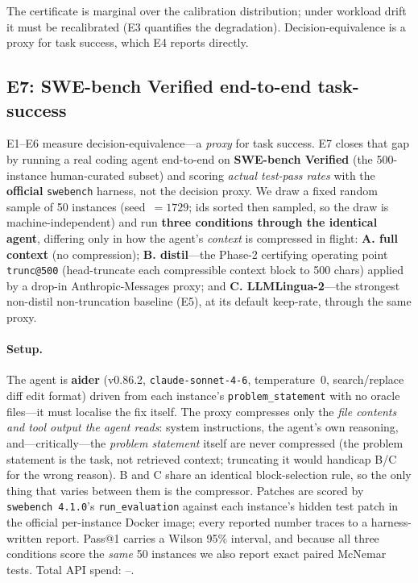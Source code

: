 \documentclass[11pt]{article}
\newcommand{\sweEsevenN}{50}\newcommand{\sweEsevenSeed}{1729}%
\newcommand{\sweEsevenTotalCost}{--}}
\begin{document}
The certificate is marginal over the calibration distribution; under workload drift
it must be recalibrated (E3 quantifies the degradation). Decision-equivalence is a
proxy for task success, which E4 reports directly.

\subsection{E7: SWE-bench Verified end-to-end task-success}
\label{sec:e7}

E1--E6 measure decision-equivalence---a \emph{proxy} for task success. E7 closes that
gap by running a real coding agent end-to-end on \textbf{SWE-bench Verified} (the
500-instance human-curated subset) and scoring \emph{actual test-pass rates} with the
\textbf{official} \texttt{swebench} harness, not the decision proxy. We draw a fixed
random sample of \sweEsevenN{} instances (seed~$=\sweEsevenSeed{}$; ids sorted then
sampled, so the draw is machine-independent) and run \textbf{three conditions through the
identical agent}, differing only in how the agent's \emph{context} is compressed in
flight: \textbf{A. full context} (no compression); \textbf{B. distil}---the Phase-2
certifying operating point \texttt{trunc@500} (head-truncate each compressible context
block to 500 chars) applied by a drop-in Anthropic-Messages proxy; and \textbf{C.
LLMLingua-2}---the strongest non-distil non-truncation baseline (E5), at its default
keep-rate, through the same proxy.

\paragraph{Setup.} The agent is \textbf{aider} (v0.86.2, \texttt{claude-sonnet-4-6},
temperature~0, search/replace diff edit format) driven from each instance's
\texttt{problem\_statement} with no oracle files---it must localise the fix itself. The
proxy compresses only the \emph{file contents and tool output the agent reads}: system
instructions, the agent's own reasoning, and---critically---the \emph{problem statement}
itself are never compressed (the problem statement is the task, not retrieved context;
truncating it would handicap B/C for the wrong reason). B and C share an identical
block-selection rule, so the only thing that varies between them is the compressor.
Patches are scored by \texttt{swebench}~\texttt{4.1.0}'s \texttt{run\_evaluation} against
each instance's hidden test patch in the official per-instance Docker image; every
reported number traces to a harness-written report. Pass@1 carries a Wilson 95\%
interval, and because all three conditions score the \emph{same} \sweEsevenN{} instances
we also report exact paired McNemar tests. Total API spend: \sweEsevenTotalCost{}.
\end{document}
